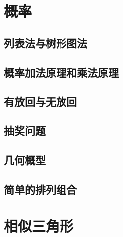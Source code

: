 \chapter{概率}
\section{列表法与树形图法}
\clearpage
\section{概率加法原理和乘法原理}
\clearpage
\section{有放回与无放回}
\clearpage
\section{抽奖问题}
\clearpage
\section{几何概型}
\clearpage
\section{简单的排列组合}
\clearpage
\chapter{相似三角形}
